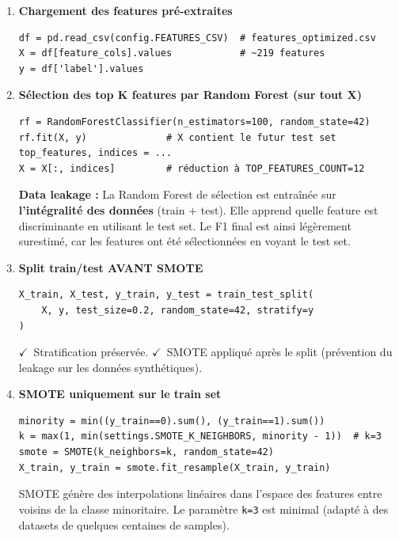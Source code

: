 \documentclass[11pt,a4paper]{article}
\newcommand{\param}[1]{\texttt{#1}}
\newcommand{\ok}{{\color{okborder}$\checkmark$}}
\begin{document}
\begin{enumerate}[leftmargin=*, label=\textbf{\arabic{*}.}]

\item \textbf{Chargement des features pré-extraites}
\begin{lstlisting}
df = pd.read_csv(config.FEATURES_CSV)  # features_optimized.csv
X = df[feature_cols].values            # ~219 features
y = df['label'].values
\end{lstlisting}

\item \textbf{Sélection des top K features par Random Forest (sur tout X)}
\begin{lstlisting}
rf = RandomForestClassifier(n_estimators=100, random_state=42)
rf.fit(X, y)              # X contient le futur test set
top_features, indices = ...
X = X[:, indices]         # réduction à TOP_FEATURES_COUNT=12
\end{lstlisting}
\begin{dangerbox}
\textbf{Data leakage :} La Random Forest de sélection est entraînée sur
\textbf{l'intégralité des données} (train + test). Elle apprend quelle feature
est discriminante en utilisant le test set. Le F1 final est ainsi légèrement
surestimé, car les features ont été sélectionnées en voyant le test set.
\end{dangerbox}

\item \textbf{Split train/test AVANT SMOTE}
\begin{lstlisting}
X_train, X_test, y_train, y_test = train_test_split(
    X, y, test_size=0.2, random_state=42, stratify=y
)
\end{lstlisting}
\begin{okbox}
\ok~Stratification préservée. \ok~SMOTE appliqué après le split
(prévention du leakage sur les données synthétiques).
\end{okbox}

\item \textbf{SMOTE uniquement sur le train set}
\begin{lstlisting}
minority = min((y_train==0).sum(), (y_train==1).sum())
k = max(1, min(settings.SMOTE_K_NEIGHBORS, minority - 1))  # k=3
smote = SMOTE(k_neighbors=k, random_state=42)
X_train, y_train = smote.fit_resample(X_train, y_train)
\end{lstlisting}
\begin{infobox}
SMOTE génère des interpolations linéaires dans l'espace des features entre
voisins de la classe minoritaire. Le paramètre \param{k=3} est minimal
(adapté à des datasets de quelques centaines de samples).
\end{infobox}


\end{enumerate}
\end{document}
